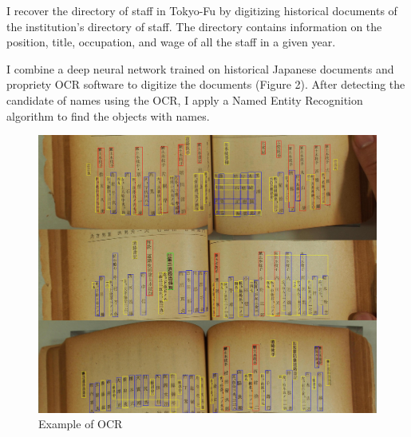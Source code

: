 \item I recover the directory of staff in Tokyo-Fu by digitizing historical documents of the institution's directory of staff. The directory contains information on the position, title, occupation, and wage of all the staff in a given year.

\item I combine a deep neural network trained on historical Japanese documents and propriety OCR software to digitize the documents (Figure 2). After detecting the candidate of names using the OCR, I apply a Named Entity Recognition algorithm to find the objects with names.

\begin{figure}
    \centering
    \includegraphics[width = \textwidth]{Data/Annotated_Page127.jpg}
    \caption{Example of OCR}
    \label{fig:enter-label}
\end{figure}